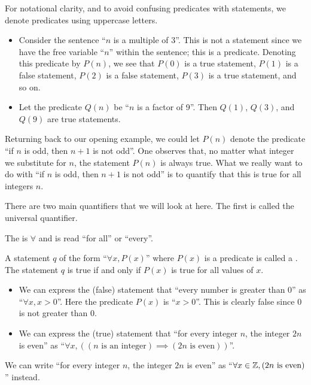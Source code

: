 For notational clarity, and to avoid confusing predicates with statements, we denote predicates using uppercase letters.

\begin{example}
    \begin{itemize}[leftmargin=*]
        \item Consider the sentence ``$n$ is a multiple of 3''. This is not a statement since we have the free variable ``$n$'' within the sentence; this is a predicate. Denoting this predicate by $P(n)$, we see that $P(0)$ is a true statement, $P(1)$ is a false statement, $P(2)$ is a false statement, $P(3)$ is a true statement, and so on.
        \item Let the predicate $Q(n)$ be ``$n$ is a factor of 9''. Then $Q(1)$, $Q(3)$, and $Q(9)$ are true statements.
    \end{itemize}
\end{example}

Returning back to our opening example, we could let $P(n)$ denote the predicate ``if $n$ is odd, then $n + 1$ is not odd''. One observes that, no matter what integer we substitute for $n$, the statement $P(n)$ is always true. What we really want to do with ``if $n$ is odd, then $n + 1$ is not odd'' is to quantify that this is true for all integers $n$.

There are two main quantifiers that we will look at here. The first is called the universal quantifier.

\begin{definition}
    The  is $\forall$ and is read ``for all'' or ``every''.

    A statement $q$ of the form ``$\forall x, P(x)$'' where $P(x)$ is a predicate is called a . The statement $q$ is true if and only if $P(x)$ is true for all values of $x$.
\end{definition}

\begin{example}
    \begin{itemize}[leftmargin=*]
        \item We can express the (false) statement that ``every number is greater than 0'' as ``$\forall x, x>0$''. Here the predicate $P(x)$ is ``$x>0$''. This is clearly false since 0 is not greater than 0.
        \item We can express the (true) statement that ``for every integer $n$, the integer $2n$ is even'' as ``$\forall x, ((n \text{ is an integer}) \implies (2n \text{ is even}))$''.
    \end{itemize}
\end{example}
\begin{remark}
    We can write ``for every integer $n$, the integer $2n$ is even'' as ``$\forall x \in \mathbb{Z}, (2n \text{ is even})$'' instead.
\end{remark}

